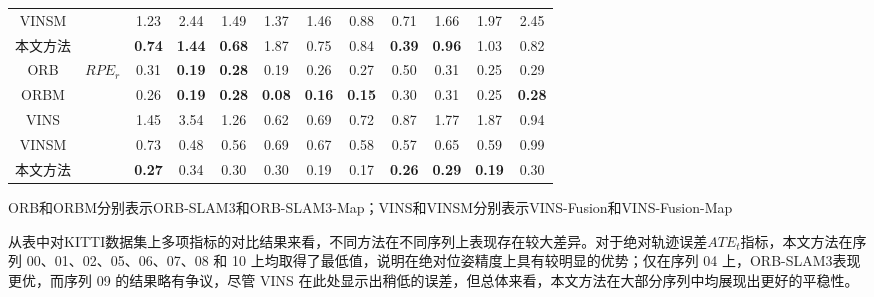 \begin{table}
\begin{tabular}{c|c|cccccccccc}
VINSM &                       & 1.23          & 2.44          & 1.49          & 1.37          & 1.46          & 0.88          & 0.71          & 1.66          & 1.97          & 2.45          \\
本文方法    &                       & \cellcolor[HTML]{FA7F6F}\textbf{0.74} & \cellcolor[HTML]{FA7F6F}\textbf{1.44} & \cellcolor[HTML]{FA7F6F}\textbf{0.68} & 1.87          & 0.75          & 0.84          & \cellcolor[HTML]{FA7F6F}\textbf{0.39} & \cellcolor[HTML]{FA7F6F}\textbf{0.96} & 1.03          & 0.82          \\ \midrule
ORB   & \multirow{5}{*}{$RPE_r$\textdownarrow{}} & 0.31          & \cellcolor[HTML]{FA7F6F}\textbf{0.19} & \cellcolor[HTML]{FA7F6F}\textbf{0.28} & 0.19          & 0.26          & 0.27          & 0.50          & 0.31          & 0.25          & 0.29          \\
ORBM  &                       & 0.26          & \cellcolor[HTML]{FA7F6F}\textbf{0.19} & \cellcolor[HTML]{FA7F6F}\textbf{0.28} & \cellcolor[HTML]{FA7F6F}\textbf{0.08} & \cellcolor[HTML]{FA7F6F}\textbf{0.16} & \cellcolor[HTML]{FA7F6F}\textbf{0.15} & 0.30          & 0.31          & 0.25          & \cellcolor[HTML]{FA7F6F}\textbf{0.28} \\
VINS  &                       & 1.45          & 3.54          & 1.26          & 0.62          & 0.69          & 0.72          & 0.87          & 1.77          & 1.87          & 0.94          \\
VINSM &                       & 0.73          & 0.48          & 0.56          & 0.69          & 0.67          & 0.58          & 0.57          & 0.65          & 0.59          & 0.99          \\
本文方法    &                       & \cellcolor[HTML]{FA7F6F}\textbf{0.27} & 0.34          & 0.30          & 0.30          & 0.19          & 0.17          & \cellcolor[HTML]{FA7F6F}\textbf{0.26} & \cellcolor[HTML]{FA7F6F}\textbf{0.29} & \cellcolor[HTML]{FA7F6F}\textbf{0.19} & 0.30          \\ \bottomrule
\end{tabular}
\label{tab:loc_kitti}
\begin{tablenotes}
  \footnotesize
  \item ORB和ORBM分别表示ORB-SLAM3和ORB-SLAM3-Map；VINS和VINSM分别表示VINS-Fusion和VINS-Fusion-Map
\end{tablenotes}
\end{table}

从表中对KITTI数据集上多项指标的对比结果来看，不同方法在不同序列上表现存在较大差异。对于绝对轨迹误差$ATE_t$指标，本文方法在序列 00、01、02、05、06、07、08 和 10 上均取得了最低值，说明在绝对位姿精度上具有较明显的优势；仅在序列 04 上，ORB-SLAM3表现更优，而序列 09 的结果略有争议，尽管 VINS 在此处显示出稍低的误差，但总体来看，本文方法在大部分序列中均展现出更好的平稳性。

